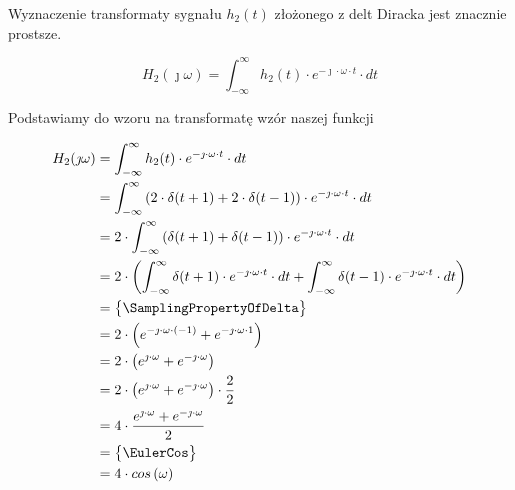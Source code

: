 \begin{task}
\begin{figure}[H]
\end{figure}

Wyznaczenie transformaty sygnału $h_2(t)$ złożonego z delt Diracka jest znacznie prostsze.

\begin{equation}
H_2(\jmath \omega )=\int_{-\infty }^{\infty}h_2(t) \cdot e^{-\jmath \cdot \omega \cdot t}\cdot dt
\end{equation}

Podstawiamy do wzoru na transformatę wzór naszej funkcji

\begin{align*}
H_2(\jmath \omega )&=\int_{-\infty }^{\infty}h_2(t) \cdot e^{-\jmath \cdot \omega \cdot t}\cdot dt\\
&=\int_{-\infty }^{\infty}\left( 2 \cdot \delta(t+1) + 2 \cdot \delta(t-1)\right) \cdot e^{-\jmath \cdot \omega \cdot t}\cdot dt\\
&=2 \cdot \int_{-\infty }^{\infty} \left( \delta(t+1) + \delta(t-1) \right) \cdot e^{-\jmath \cdot \omega \cdot t}\cdot dt\\
&=2 \cdot \left( \int_{-\infty }^{\infty} \delta(t+1) \cdot e^{-\jmath \cdot \omega \cdot t}\cdot dt + \int_{-\infty }^{\infty} \delta(t-1) \cdot e^{-\jmath \cdot \omega \cdot t}\cdot dt \right)\\
&=\begin{Bmatrix}
\SamplingPropertyOfDelta
\end{Bmatrix}\\
&= 2 \cdot \left( e^{-\jmath \cdot \omega \cdot (-1)} + e^{-\jmath \cdot \omega \cdot 1} \right)\\
&= 2 \cdot \left( e^{\jmath \cdot \omega} + e^{-\jmath \cdot \omega} \right)\\
&= 2 \cdot \left( e^{\jmath \cdot \omega} + e^{-\jmath \cdot \omega} \right) \cdot \frac{2}{2}\\
&= 4 \cdot \frac{ e^{\jmath \cdot \omega} + e^{-\jmath \cdot \omega} }{2} \\
&=\begin{Bmatrix}
\EulerCos
\end{Bmatrix}\\
&= 4 \cdot cos\left( \omega\right) \\
\end{align*}


\end{task}

